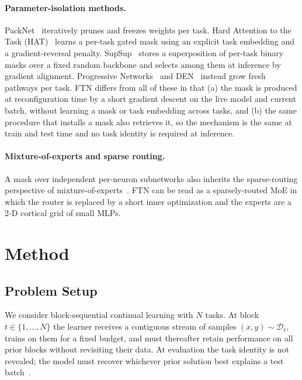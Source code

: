\documentclass{article}
\begin{document}
\paragraph{Parameter-isolation methods.}
PackNet~\citep{mallya2018packnet} iteratively prunes and freezes weights per task. Hard Attention to the Task (HAT)~\citep{serra2018overcoming} learns a per-task gated mask using an explicit task embedding and a gradient-reversal penalty. SupSup~\citep{wortsman2020supermasks} stores a superposition of per-task binary masks over a fixed random backbone and selects among them at inference by gradient alignment. Progressive Networks~\citep{rusu2016progressive} and DEN~\citep{yoon2018lifelong} instead grow fresh pathways per task. FTN differs from all of these in that (a) the mask is produced at reconfiguration time by a short gradient descent on the live model and current batch, without learning a mask or task embedding across tasks, and (b) the same procedure that installs a mask also retrieves it, so the mechanism is the same at train and test time and no task identity is required at inference.

\paragraph{Mixture-of-experts and sparse routing.}
A mask over independent per-neuron subnetworks also inherits the sparse-routing perspective of mixture-of-experts~\citep{shazeer2017outrageously,fedus2022switch}. FTN can be read as a sparsely-routed MoE in which the router is replaced by a short inner optimization and the experts are a 2-D cortical grid of small MLPs.

\section{Method}
\label{sec:method}

\subsection{Problem Setup}

We consider block-sequential continual learning with $N$ tasks. At block $t \in \{1,\ldots,N\}$ the learner receives a contiguous stream of samples $(x,y) \sim \mathcal{D}_t$, trains on them for a fixed budget, and must thereafter retain performance on all prior blocks without revisiting their data. At evaluation the task identity is not revealed; the model must recover whichever prior solution best explains a test batch~\citep{van2019three}.
\end{document}
